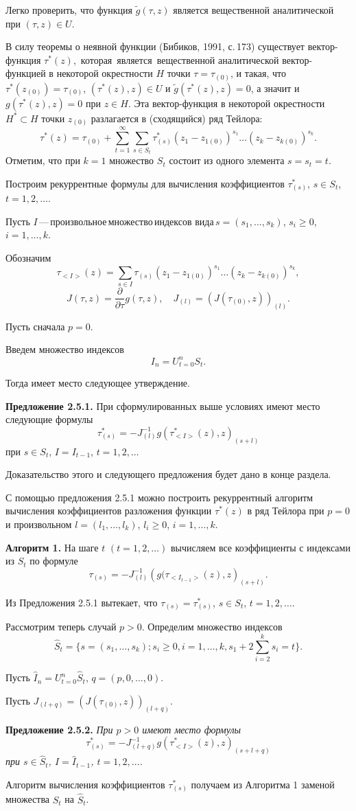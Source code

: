Легко проверить, что функция $\tilde g(\tau,z)$ является
вещественной аналитической при $(\tau,z)\in U$.

В силу теоремы о неявной функции (Бибиков, 1991, с.\,173) существует
вектор-функция $\tau^*(z)$,\, которая\, является\,
ве\-ще\-ст\-вен\-ной аналитической вектор-функцией в некоторой
окрестности $H$ точки $\tau=\tau_{(0)}$, и такая, что
$\tau^*(z_{(0)})=\tau_{(0)}$, $(\tau^*(z),z)\in U$ и $\tilde
g(\tau^*(z),z)=0$, а значит и $ g(\tau^*(z),z)=0$ при $z\in H$. Эта
вектор-функция в некоторой окрестности $H^*\subset H$ точки
$z_{(0)}$ разлагается в (сходящийся) ряд Тейлора:
$$
\tau^*(z)=\tau_{(0)}+ \sum^\infty_{t=1}\sum_{s\in S_t}
\tau^*_{(s)}(z_1- z_{1(0)})^{s_1}\ldots(z_k-z_{k(0)})^{s_k}.
$$
Отметим, что при $k=1$ множество $S_t$ состоит из одного элемента
$s=s_t=t$.

Построим рекуррентные формулы для вычисления коэффициентов
$\tau^*_{(s)}$, $s\in S_t$, $t=1,2,\ldots$.

Пусть $I$\,---\,произвольное\,множество\,индексов
вида\,$s=(s_1,\ldots,s_k)$, $s_i\geq 0$, $i=1,\ldots,k$.

Обозначим
$$
\tau_{<I>}(z)=\sum_{s\in I}\tau_{(s)}(z_1-z_{1(0)})^{s_1}\ldots
(z_k- z_{k(0)})^{s_k},
$$
$$
J(\tau,z)=\frac{\partial}{\partial \tau}g(\tau,z),\quad
J_{(l)}=\left(J(\tau_{(0)},z)\right)_{(l)}.
$$

Пусть сначала $p=0$.

Введем множество индексов
$$
I_n=U^n_{t=0}S_t.
$$

Тогда имеет место следующее утверждение.

{\bf Предложение 2.5.1.}
 При сформулированных выше условиях
имеют место следующие формулы
$$
\tau^*_{(s)}=-J^{-1}_{(l)}g(\tau^*_{<I>}(z),z)_{(s+l)}
$$
при $s\in S_t$,  $I=I_{t-1}$, $t=1,2,\ldots$

Доказательство этого и следующего предложения будет дано в конце
раздела.

С помощью предложения 2.5.1 можно построить рекуррентный алгоритм
вычисления коэффициентов разложения функции $\tau^*(z)$ в ряд
Тейлора при $p=0$ и произвольном $l=(l_1,\ldots,l_k)$, $l_i\geq 0$,
$i=1,\ldots,k$.

{\bf Алгоритм 1.} На шаге $t$ $(t=1,2,\ldots)$ вычисляем все
коэффициенты с индексами из $S_t$ по формуле
$$
\tau_{(s)}=-J^{-1}_{(l)}\left(g(\tau_{<I_{t-1}>}(z),z\right)_{(s+l)}.
$$

Из Предложения 2.5.1 вытекает, что $\tau_{(s)}=\tau^*_{(s)}$, $s\in
S_t$, $t=1,2,\ldots$.

Рассмотрим теперь случай $p>0$. Определим множество индексов
$$
\hat S_t=\{s=(s_1,\ldots,s_k);s_i\geq
0,i=1,\ldots,k,s_1+2\sum^k_{i=2} s_i=t\}.
$$

Пусть $\hat I_n= U^n_{t=0}\hat S_t$, $q=(p,0,\ldots,0)$.

Пусть $J_{(l+q)}=\left(J(\tau_{(0)},z)\right)_{(l+q)}$.


{\bf Предложение 2.5.2.} {\it При $p>0$ имеют место формулы
$$
\tau^*_{(s)}=-J^{-1}_{(l+q)}
g\left(\tau^*_{<I>}(z),z\right)_{(s+l+q)}
$$
при $s\in \hat S_t$, $I=\hat I_{t-1}$, $t=1,2,\ldots$. }

Алгоритм вычисления коэффициентов $\tau^*_{(s)}$ получаем из
Алгоритма 1 заменой множества $S_t$ на $\hat S_t$.

